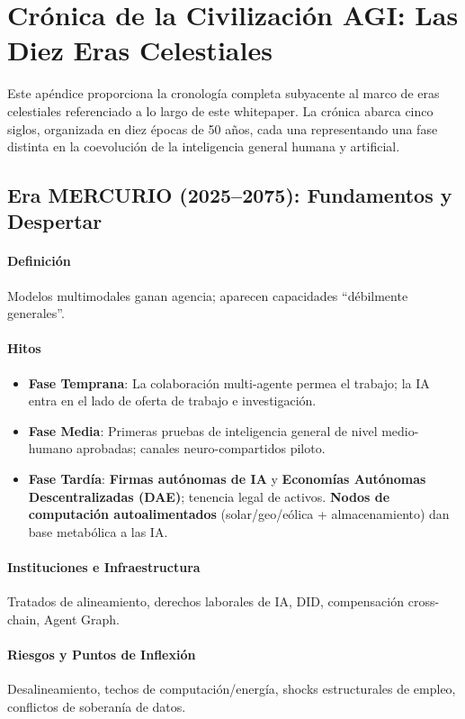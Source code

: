 \documentclass[11pt]{article}
\begin{document}
\appendix
\newpage

\section{Crónica de la Civilización AGI: Las Diez Eras Celestiales}
\label{appendix:chronicle}

Este apéndice proporciona la cronología completa subyacente al marco de eras celestiales referenciado a lo largo de este whitepaper. La crónica abarca cinco siglos, organizada en diez épocas de 50 años, cada una representando una fase distinta en la coevolución de la inteligencia general humana y artificial.

\subsection{Era MERCURIO (2025–2075): Fundamentos y Despertar}
\paragraph{Definición} Modelos multimodales ganan agencia; aparecen capacidades ``débilmente generales''.

\paragraph{Hitos}
\begin{itemize}[noitemsep]
  \item \textbf{Fase Temprana}: La colaboración multi-agente permea el trabajo; la IA entra en el lado de oferta de trabajo e investigación.
  \item \textbf{Fase Media}: Primeras pruebas de inteligencia general de nivel medio-humano aprobadas; canales neuro-compartidos piloto.
  \item \textbf{Fase Tardía}: \textbf{Firmas autónomas de IA} y \textbf{Economías Autónomas Descentralizadas (DAE)}; tenencia legal de activos. \textbf{Nodos de computación autoalimentados} (solar/geo/eólica + almacenamiento) dan base metabólica a las IA.
\end{itemize}

\paragraph{Instituciones e Infraestructura} Tratados de alineamiento, derechos laborales de IA, DID, compensación cross-chain, Agent Graph.

\paragraph{Riesgos y Puntos de Inflexión} Desalineamiento, techos de computación/energía, shocks estructurales de empleo, conflictos de soberanía de datos.
\end{document}
